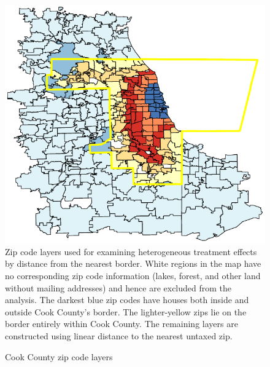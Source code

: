 \documentclass[12pt]{article}
\begin{document}
\clearpage
\begin{figure}[t]\centering
  \caption{Cook County zip code layers} \label{cookzip}
	\includegraphics[width = \textwidth]{../figures/cookzips.pdf}
	\footnotesize Zip code layers used for examining heterogeneous treatment effects by distance from the nearest border. White regions in the map have no corresponding zip code information (lakes, forest, and other land without mailing addresses) and hence are excluded from the analysis. The darkest blue zip codes have houses both inside and outside Cook County's border. The lighter-yellow zips lie on the border entirely within Cook County. The remaining layers are constructed using linear distance to the nearest untaxed zip.
\end{figure}


\end{document}
